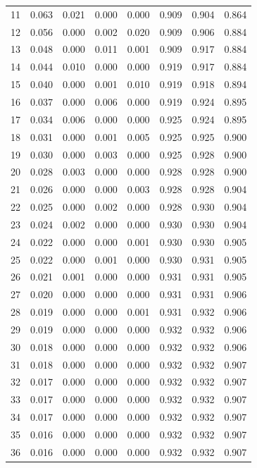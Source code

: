 \documentclass{article}%
\begin{document}
\begin{table}[h!]
\begin{tabular}{cccccccc}
11 & 0.063 & 0.021 & 0.000 & 0.000 & 0.909 & 0.904 & 0.864 \\
12 & 0.056 & 0.000 & 0.002 & 0.020 & 0.909 & 0.906 & 0.884 \\
13 & 0.048 & 0.000 & 0.011 & 0.001 & 0.909 & 0.917 & 0.884 \\
14 & 0.044 & 0.010 & 0.000 & 0.000 & 0.919 & 0.917 & 0.884 \\
15 & 0.040 & 0.000 & 0.001 & 0.010 & 0.919 & 0.918 & 0.894 \\
16 & 0.037 & 0.000 & 0.006 & 0.000 & 0.919 & 0.924 & 0.895 \\
17 & 0.034 & 0.006 & 0.000 & 0.000 & 0.925 & 0.924 & 0.895 \\
18 & 0.031 & 0.000 & 0.001 & 0.005 & 0.925 & 0.925 & 0.900 \\
19 & 0.030 & 0.000 & 0.003 & 0.000 & 0.925 & 0.928 & 0.900 \\
20 & 0.028 & 0.003 & 0.000 & 0.000 & 0.928 & 0.928 & 0.900 \\
21 & 0.026 & 0.000 & 0.000 & 0.003 & 0.928 & 0.928 & 0.904 \\
22 & 0.025 & 0.000 & 0.002 & 0.000 & 0.928 & 0.930 & 0.904 \\
23 & 0.024 & 0.002 & 0.000 & 0.000 & 0.930 & 0.930 & 0.904 \\
24 & 0.022 & 0.000 & 0.000 & 0.001 & 0.930 & 0.930 & 0.905 \\
25 & 0.022 & 0.000 & 0.001 & 0.000 & 0.930 & 0.931 & 0.905 \\
26 & 0.021 & 0.001 & 0.000 & 0.000 & 0.931 & 0.931 & 0.905 \\
27 & 0.020 & 0.000 & 0.000 & 0.000 & 0.931 & 0.931 & 0.906 \\
28 & 0.019 & 0.000 & 0.000 & 0.001 & 0.931 & 0.932 & 0.906 \\
29 & 0.019 & 0.000 & 0.000 & 0.000 & 0.932 & 0.932 & 0.906 \\
30 & 0.018 & 0.000 & 0.000 & 0.000 & 0.932 & 0.932 & 0.906 \\
31 & 0.018 & 0.000 & 0.000 & 0.000 & 0.932 & 0.932 & 0.907 \\
32 & 0.017 & 0.000 & 0.000 & 0.000 & 0.932 & 0.932 & 0.907 \\
33 & 0.017 & 0.000 & 0.000 & 0.000 & 0.932 & 0.932 & 0.907 \\
34 & 0.017 & 0.000 & 0.000 & 0.000 & 0.932 & 0.932 & 0.907 \\
35 & 0.016 & 0.000 & 0.000 & 0.000 & 0.932 & 0.932 & 0.907 \\
36 & 0.016 & 0.000 & 0.000 & 0.000 & 0.932 & 0.932 & 0.907 \\

\end{tabular}
\end{table}
\end{document}
